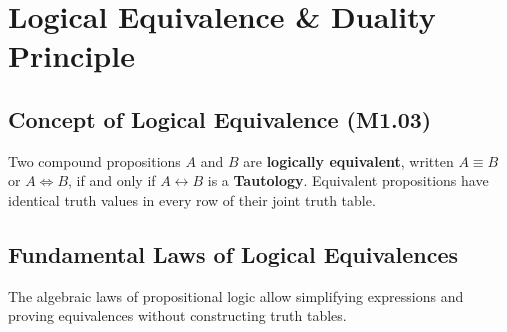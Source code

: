 \documentclass[11pt,a4paper]{article}
\begin{document}
\section{Logical Equivalence \& Duality Principle}

\subsection{Concept of Logical Equivalence (M1.03)}

\begin{definition}
Two compound propositions $A$ and $B$ are \textbf{logically equivalent}, written $A \equiv B$ or $A \Leftrightarrow B$, if and only if $A \leftrightarrow B$ is a \textbf{Tautology}. Equivalent propositions have identical truth values in every row of their joint truth table.
\end{definition}

\subsection{Fundamental Laws of Logical Equivalences}

The algebraic laws of propositional logic allow simplifying expressions and proving equivalences without constructing truth tables.
\end{document}
